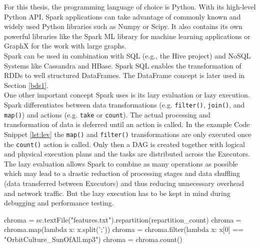 For this thesis, the programming language of choice is Python. With its high-level Python API, Spark applications can take advantage of commonly known and widely used Python libraries such as Numpy or Scipy. It also contains its own powerful libraries like the Spark ML library for machine learning applications or GraphX for the work with large graphs.\\ 
Spark can be used in combination with SQL (e.g., the Hive project) and NoSQL Systems like Cassandra and HBase. Spark SQL enables the transformation of RDDs to well structured DataFrames. The DataFrame concept is later used in Section \ref{bds1}.\\
One other important concept Spark uses is its lazy evaluation or lazy execution. Spark differentiates between data transformations (e.g. \lstinline{filter()}, \lstinline{join()}, and \lstinline{map()}) and actions (e.g. \lstinline{take} or \lstinline{count}). The actual processing and transformation of data is deferred until an action is called. In the example Code Snippet \ref{lst:lev} the \lstinline{map()} and \lstinline{filter()} transformations are only executed once the \lstinline{count()} action is called. Only then a DAG is created together with logical and physical execution plans and the tasks are distributed across the Executors. The lazy evaluation allows Spark to combine as many operations as possible which may lead to a drastic reduction of processing stages and data shuffling (data transferred between Executors) and thus reducing unnecessary overhead and  network traffic. But the lazy execution has to be kept in mind during debugging and performance testing. \cite[p.73]{sparkbook1}

\begin{pythonCode}[frame=single,label={lst:lev},caption={Lazy evaluation},captionpos=b]
chroma = sc.textFile("features.txt").repartition(repartition_count)
chroma = chroma.map(lambda x: x.split(';'))
chroma = chroma.filter(lambda x: x[0] == "OrbitCulture_SunOfAll.mp3")
chroma = chroma.count()
\end{pythonCode}

